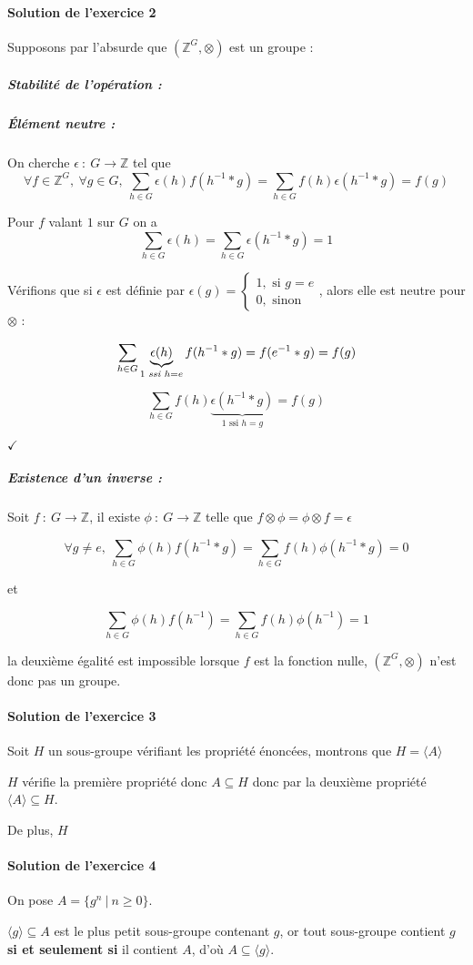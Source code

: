 \documentclass[]{article}
\theoremstyle{remark}
\theoremstyle{definition}
\newcommand{\checked}{
	\hfill$\checkmark$
}
\newcommand{\funcshort}[3]{
#1 ~ : ~ #2 \longrightarrow #3
}
\begin{document}
\paragraph{Solution de l'exercice 2}

Supposons par l'absurde que $\left(\mathbb{Z}^G, \otimes\right)$ est un groupe :

\subparagraph{Stabilité de l'opération :} \checkmark

\subparagraph{Élément neutre :} On cherche $\funcshort{\epsilon}{G}{\mathbb{Z}}$ tel que
$$\forall f \in \mathbb{Z}^G, ~ \forall g \in G, ~ \sum_{h \in G}\epsilon(h)f(h^{-1}*g)=\sum_{h \in G}f(h)\epsilon(h^{-1}*g)=f(g)$$

Pour $f$ valant $1$ sur $G$ on a
$$\sum_{h \in G}\epsilon(h)=\sum_{h \in G}\epsilon(h^{-1}*g)=1$$

Vérifions que si $\epsilon$ est définie par $\epsilon(g) = \left\{
\begin{array}{l}
	1, \text{ si } g = e \\
	0, \text{ sinon}
\end{array}
\right.$, alors elle est neutre pour $\otimes$ :

$$\sum_{h \in G}\underbrace{\epsilon(h)}_{1 \text{ \textit{ssi} } h = e}f(h^{-1}*g) = f(e^{-1}*g) = f(g)$$

$$\sum_{h \in G}f(h)\underbrace{\epsilon(h^{-1}*g)}_{1 \text{ ssi } h = g}=f(g)$$

\checked

\subparagraph{Existence d'un inverse :}
Soit $\funcshort{f}{G}{\mathbb{Z}}$, il existe $\funcshort{\phi}{G}{\mathbb{Z}}$ telle que $f \otimes \phi = \phi \otimes f = \epsilon$

$$\forall g \neq e, ~ \sum_{h \in G}\phi(h)f(h^{-1}*g)=\sum_{h \in G}f(h)\phi(h^{-1}*g)=0$$

et

$$\sum_{h \in G}\phi(h)f(h^{-1})=\sum_{h \in G}f(h)\phi(h^{-1})=1$$

la deuxième égalité est impossible lorsque $f$ est la fonction nulle, $\left(\mathbb{Z}^G, \otimes\right)$ n'est donc pas un groupe.

\paragraph{Solution de l'exercice 3}
Soit $H$ un sous-groupe vérifiant les propriété énoncées, montrons que $H=\langle A \rangle$

$H$ vérifie la première propriété donc $A \subseteq H$ donc par la deuxième propriété $\langle A \rangle \subseteq H$.

De plus, $H$ 

\paragraph{Solution de l'exercice 4}
On pose $A = \{g^n ~ | ~ n \geqslant 0\}$.

$\langle g \rangle \subseteq A$ est le plus petit sous-groupe contenant $g$, or tout sous-groupe contient $g$ \textbf{si et seulement si} il contient $A$, d'où $A \subseteq \langle g \rangle$.
\end{document}
